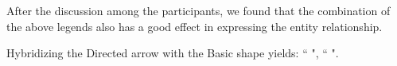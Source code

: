 \documentclass[review,journal]{vgtc}         %
\begin{document}
After the discussion among the participants, we found that the combination of the above legends also has a good effect in expressing the entity relationship. 

 Hybridizing the Directed arrow with the Basic shape yields: ``  ", ``  ".
\end{document}
